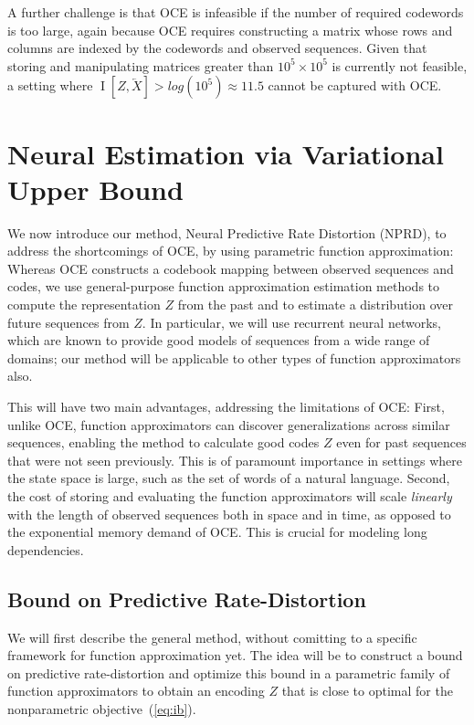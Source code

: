 \documentclass[11pt,letterpaper]{article}
\begin{document}
A further challenge is that OCE is infeasible if the number of required codewords is too large, again because OCE requires constructing a matrix whose rows and columns are indexed by the codewords and observed sequences.
Given that storing and manipulating matrices greater than $10^5 \times 10^5$ is currently not feasible, a setting where $\operatorname{I}[Z, \overleftarrow{X}] > log(10^5) \approx 11.5$ cannot be captured with OCE.

\section{Neural Estimation via Variational Upper Bound}\label{sec:nprd}

We now introduce our method, Neural Predictive Rate Distortion (NPRD), to address the shortcomings of OCE, by using parametric function approximation:
Whereas OCE constructs a codebook mapping between observed sequences and codes, we use general-purpose function approximation estimation methods to compute the representation $Z$ from the past and to estimate a distribution over future sequences from $Z$.
In particular, we will use recurrent neural networks, which are known to provide good models of sequences from a wide range of domains; our method will be applicable to other types of function approximators also.

This will have two main advantages, addressing the limitations of OCE:
First, unlike OCE, function approximators can discover generalizations across similar sequences, enabling the method to calculate good codes $Z$ even for past sequences that were not seen previously.
This is of paramount importance in settings where the state space is large, such as the set of words of a natural language.
Second, the cost of storing and evaluating the function approximators will scale \emph{linearly} with the length of observed sequences both in space and in time, as opposed to the exponential memory demand of OCE.
This is crucial for modeling long dependencies.

\subsection{Bound on Predictive Rate-Distortion}
We will first describe the general method, without comitting to a specific framework for function approximation yet.
The idea will be to construct a bound on predictive rate-distortion and optimize this bound in a parametric family of function approximators to obtain an encoding $Z$ that is close to optimal for the nonparametric objective~(\ref{eq:ib}).
\end{document}
